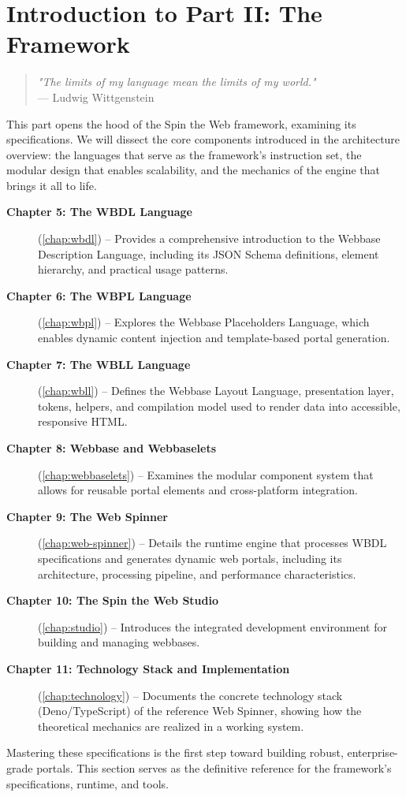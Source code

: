 
\chapter*{Introduction to Part II: The Framework}
\label{part:framework}

\begin{quote}
\textit{"The limits of my language mean the limits of my world."} \\
— Ludwig Wittgenstein
\end{quote}

This part opens the hood of the Spin the Web framework, examining its specifications. We will dissect the core components introduced in the architecture overview: the languages that serve as the framework's instruction set, the modular design that enables scalability, and the mechanics of the engine that brings it all to life.

\begin{description}
\item[\textbf{Chapter 5: The WBDL Language}] (\cref{chap:wbdl}) -- Provides a comprehensive introduction to the Webbase Description Language, including its JSON Schema definitions, element hierarchy, and practical usage patterns.

\item[\textbf{Chapter 6: The WBPL Language}] (\cref{chap:wbpl}) -- Explores the Webbase Placeholders Language, which enables dynamic content injection and template-based portal generation.

\item[\textbf{Chapter 7: The WBLL Language}] (\cref{chap:wbll}) -- Defines the Webbase Layout Language, presentation layer, tokens, helpers, and compilation model used to render data into accessible, responsive HTML.

\item[\textbf{Chapter 8: Webbase and Webbaselets}] (\cref{chap:webbaselets}) -- Examines the modular component system that allows for reusable portal elements and cross-platform integration.

\item[\textbf{Chapter 9: The Web Spinner}] (\cref{chap:web-spinner}) -- Details the runtime engine that processes WBDL specifications and generates dynamic web portals, including its architecture, processing pipeline, and performance characteristics.

\item[\textbf{Chapter 10: The Spin the Web Studio}] (\cref{chap:studio}) -- Introduces the integrated development environment for building and managing webbases.

\item[\textbf{Chapter 11: Technology Stack and Implementation}] (\cref{chap:technology}) -- Documents the concrete technology stack (Deno/TypeScript) of the reference Web Spinner, showing how the theoretical mechanics are realized in a working system.
\end{description}

Mastering these specifications is the first step toward building robust, enterprise-grade portals. This section serves as the definitive reference for the framework's specifications, runtime, and tools.
